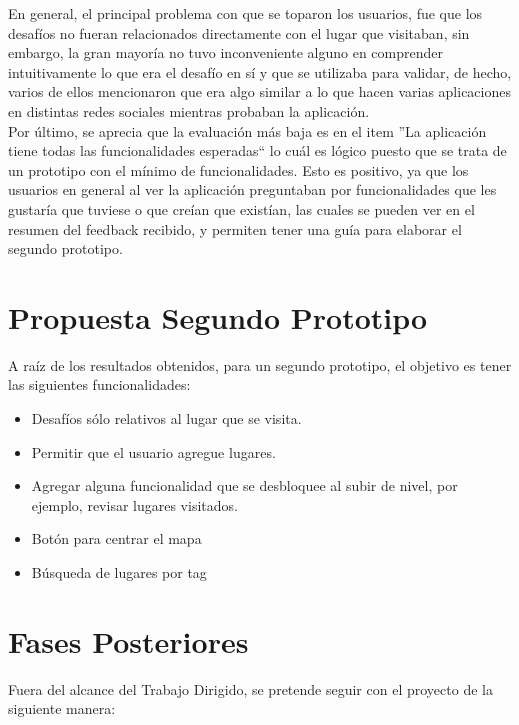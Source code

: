 \documentclass[10pt,letterpaper]{article}
\begin{document}
En general, el principal problema con que se toparon los usuarios, fue que los desafíos no fueran relacionados directamente con el lugar que visitaban, sin embargo, la gran mayoría no tuvo inconveniente alguno en comprender intuitivamente lo que era el desafío en sí y que se utilizaba para validar, de hecho, varios de ellos mencionaron que era algo similar a lo que hacen varias aplicaciones en distintas redes sociales mientras probaban la aplicación.\\

Por último, se aprecia que la evaluación más baja es en el item ''La aplicación tiene todas las funcionalidades esperadas`` lo cuál es lógico puesto que se trata de un prototipo con el mínimo de funcionalidades. Esto es positivo, ya que los usuarios en general al ver la aplicación preguntaban por funcionalidades que les gustaría que tuviese o que creían que existían, las cuales se pueden ver en el resumen del feedback recibido, y permiten tener una guía para elaborar el segundo prototipo.\\

\newpage
\section{Propuesta Segundo Prototipo}

A raíz de los resultados obtenidos, para un segundo prototipo, el objetivo es tener las siguientes funcionalidades:\\

\begin{itemize}
\item Desafíos sólo relativos al lugar que se visita.
\item Permitir que el usuario agregue lugares.
\item Agregar alguna funcionalidad que se desbloquee al subir de nivel, por ejemplo, revisar lugares visitados.
\item Botón para centrar el mapa
\item Búsqueda de lugares por tag
\end{itemize}

\newpage
\section{Fases Posteriores}

Fuera del alcance del Trabajo Dirigido, se pretende seguir con el proyecto de la siguiente manera:\\
\end{document}
